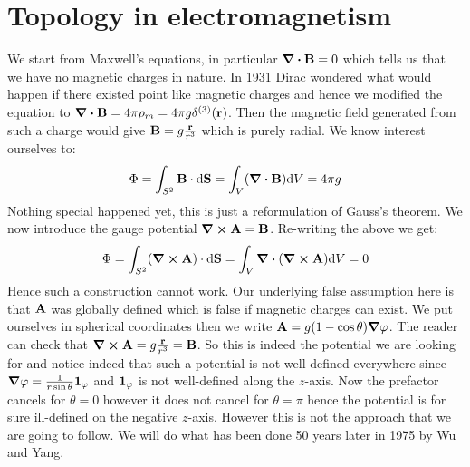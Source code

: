 \documentclass[10pt,a4paper]{book}
\begin{document}
\section{Topology in electromagnetism}
\begin{figure}
\centering
{}
\end{figure}
We start from Maxwell's equations, in particular $\div \vb{B} = 0$ which tells us that we have no magnetic charges in nature. In 1931 Dirac wondered what would happen if there existed point like magnetic charges and hence we modified the equation to $\div \vb{B} = 4 \pi \rho_m = 4 \pi g \delta^{(3)} (\vb{r})$. Then the magnetic field generated from such a charge would give $\vb{B} = g \frac{\vb{r}}{r^3}$ which is purely radial. We know interest ourselves to:
\[
\Phi = \int_{S^2} \vb{B} \cdot \dd\vb{S} = \int_V (\div \vb{B}) \dd V = 4 \pi g 
\]
Nothing special happened yet, this is just a reformulation of Gauss's theorem. We now introduce the gauge potential $\curl \vb{A} = \vb{B}$.  Re-writing the above we get:
\[
\Phi = \int_{S^2} (\curl \vb{A}) \cdot \dd \vb{S} = \int_V \div (\curl \vb{A}) \dd V = 0 
\]
Hence such a construction cannot work. Our underlying false assumption here is that $\vb{A}$ was globally defined which is false if magnetic charges can exist. We put ourselves in spherical coordinates then we write $\vb{A} = g(1 - \cos \theta) \grad \varphi$. The reader can check that $\curl \vb{A} = g \frac{\vb{r}}{r^3} = \vb{B}$. So this is indeed the potential we are looking for and notice indeed that such a potential is not well-defined everywhere since $\grad \varphi = \frac{1}{r\sin\theta} \vb{1}_\varphi$ and $\vb{1}_\varphi$ is not well-defined along the $z$-axis. Now the prefactor cancels for $\theta = 0$ however it does not cancel for $\theta = \pi$ hence the potential is for sure ill-defined on the negative $z$-axis. However this is not the approach that we are going to follow. We will do what has been done 50 years later in 1975 by Wu and Yang. 
\end{document}
